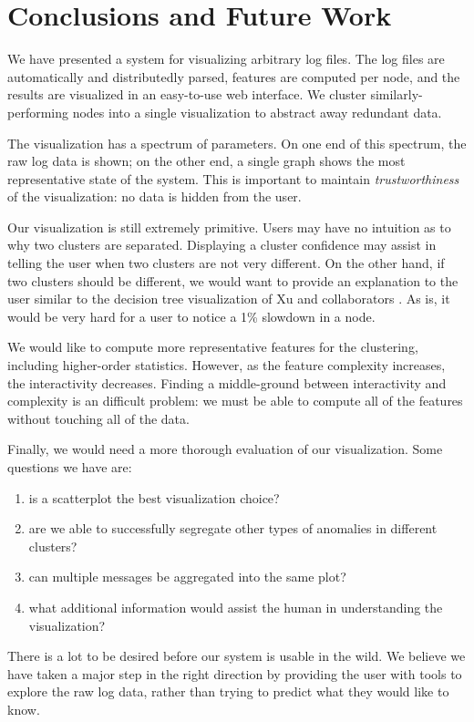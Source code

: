 \documentclass[conference]{style/acmsiggraph}
\begin{document}
\section{Conclusions and Future Work}

We have presented a system for visualizing arbitrary log files.
The log files are automatically and distributedly parsed, features are computed per node, and the results are visualized in an easy-to-use web interface.
We cluster similarly-performing nodes into a single visualization to abstract away redundant data.

The visualization has a spectrum of parameters.
On one end of this spectrum, the raw log data is shown; on the other end, a single graph shows the most representative state of the system.
This is important to maintain \emph{trustworthiness} of the visualization: no data is hidden from the user.

Our visualization is still extremely primitive.
Users may have no intuition as to why two clusters are separated.
Displaying a cluster confidence may assist in telling the user when two clusters are not very different.
On the other hand, if two clusters should be different, we would want to provide an explanation to the user similar to the decision tree visualization of Xu and collaborators .
As is, it would be very hard for a user to notice a 1\% slowdown in a node.

We would like to compute more representative features for the clustering, including higher-order statistics.
However, as the feature complexity increases, the interactivity decreases.
Finding a middle-ground between interactivity and complexity is an difficult problem: we must be able to compute all of the features without touching all of the data.

Finally, we would need a more thorough evaluation of our visualization.
Some questions we have are:
\begin{enumerate}
    \item is a scatterplot the best visualization choice?
    \item are we able to successfully segregate other types of anomalies in different clusters?
    \item can multiple messages be aggregated into the same plot?
    \item what additional information would assist the human in understanding the visualization?
\end{enumerate}

There is a lot to be desired before our system is usable in the wild.
We believe we have taken a major step in the right direction by providing the user with tools to explore the raw log data, rather than trying to predict what they would like to know.
\end{document}
